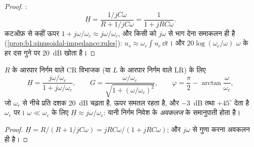 \begin{proof}
:
\[
\underline H = \frac{1/jC\omega}{R + 1/jC\omega} = \frac{1}{1 + jRC\omega} .
\]
कटऑफ़ से कहीं ऊपर $1 + j\omega/\omega_c \approx j\omega/\omega_c$, और
किसी  को $j\omega$ से भाग देना समाकलन ही है
(\cref{prop:b1:sinusoidal-impedance:rules}): $u_s \approx \omega_c\int u_e\,\dd t$।
और $20\log(\omega_c/\omega)$ $\omega$ के हर दस गुने पर \qty{20}{dB} खोता है।
\end{proof}

\begin{proposition}[प्रथम कोटि का उच्च-पारक]\label{prop:b1:filters-transfer-functions:highpass1}
$R$ के आरपार निर्गम वाले CR विभाजक (या $L$ के आरपार निर्गम वाले LR) के
लिए
\[
\underline H = \frac{j\omega/\omega_c}{1 + j\omega/\omega_c},
\qquad G = \frac{\omega/\omega_c}{\sqrt{1 + (\omega/\omega_c)^2}},
\qquad \varphi = \frac{\pi}{2} - \arctan\frac{\omega}{\omega_c},
\]
जो $\omega_c$ से नीचे प्रति दशक \qty{20}{dB} चढ़ता है, ऊपर समतल रहता है, और
\qty{-3}{dB} तथा $+45^\circ$ देता है $\omega_c$ पर। $\omega \ll \omega_c$ के
लिए $\underline H
\approx j\omega/\omega_c$: यानी निर्गम निवेश के
\emph{अवकलज} के समानुपाती होता है।
\end{proposition}

\begin{proof}
$\underline H = R/(R + 1/jC\omega) = jRC\omega/(1 + jRC\omega)$;
और $j\omega$ से गुणा करना अवकलन ही है।
\end{proof}

